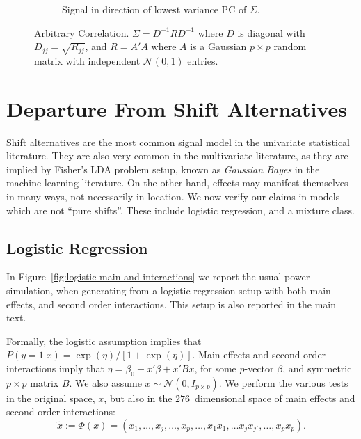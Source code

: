 \documentclass[oupdraft]{bio}
\begin{document}
\begin{figure}[h]
\begin{subfigure}[t]{.45\columnwidth}
		\caption{Signal in direction of lowest variance PC of $\Sigma$.} 
		\label{fig:dependence_32}
	\end{subfigure}
	\caption{Arbitrary Correlation. 
		$\Sigma=D^{-1} R D^{-1}$ where $D$ is diagonal with $D_{jj}=\sqrt{R_{jj}}$, and $R=A'A$ where $A$ is a Gaussian $p\times p$ random matrix with independent $\mathcal{N}(0,1)$ entries.
	}
	\label{fig:dependence_3}
\end{figure}






\section{Departure From Shift Alternatives}

Shift alternatives are the most common signal model in the univariate statistical literature. 
They are also very common in the multivariate literature, as they are implied by Fisher's LDA problem setup, known as \emph{Gaussian Bayes} in the machine learning literature.
On the other hand, effects may manifest themselves in many ways, not necessarily in location. 
We now verify our claims in models which are not ``pure shifts''. 
These include logistic regression, and a mixture class. 


\subsection{Logistic Regression}

In Figure~\ref{fig:logistic-main-and-interactions} we report the usual power simulation, when generating from a logistic regression setup with both main effects, and second order interactions.
This setup is also reported in the main text.

Formally, the logistic assumption implies that 
$P(y=1|x)=\exp(\eta)/[1+\exp(\eta)]$.
Main-effects and second order interactions imply that 
$\eta=\beta_0+x'\beta +x'Bx$, for some $p$-vector $\beta$, and symmetric $p \times p$ matrix $B$.
We also assume $x \sim \mathcal{N}(0,I_{p\times p})$.
We perform the various tests in the original space, $x$, but also in the $276$~dimensional space of main effects and second order interactions: 
$$\tilde{x}:=\Phi(x)=(x_1,\dots,x_j,\dots,x_p,\dots,x_1x_1,\dots x_jx_{j'},\dots,x_p x_p).$$
\end{document}
